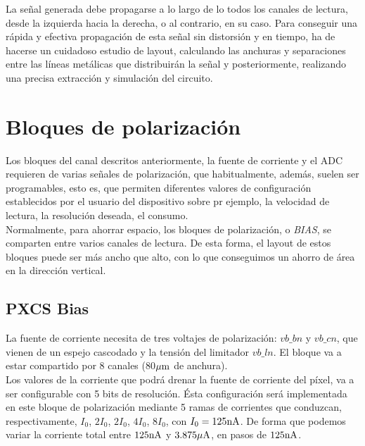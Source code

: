 La señal generada debe propagarse a lo largo de lo todos los canales de lectura,
desde la izquierda hacia la derecha, o al contrario, en su caso. Para conseguir
una rápida y efectiva propagación de esta señal sin distorsión y en tiempo, ha
de hacerse un cuidadoso estudio de layout, calculando las anchuras y separaciones
entre las líneas metálicas que distribuirán la señal y posteriormente, realizando
una precisa extracción y simulación del circuito.\\

\section{Bloques de polarización}\label{cap:ro_sch_bias}

Los bloques del canal descritos anteriormente, la fuente de corriente y el ADC
requieren de varias señales de polarización, que habitualmente, además, suelen
ser programables, esto es, que permiten diferentes valores de configuración
establecidos por el usuario del dispositivo sobre pr ejemplo, la velocidad de
lectura, la resolución deseada, el consumo.\\

Normalmente, para ahorrar espacio, los bloques de polarización, o \textit{BIAS},
se comparten entre varios canales de lectura. De esta forma, el layout de estos
bloques puede ser más ancho que alto, con lo que conseguimos un ahorro de área en
la dirección vertical.\\

\subsection{PXCS Bias}

La fuente de corriente necesita de tres voltajes de polarización: $vb\_bn$ y
$vb\_cn$, que vienen de un espejo cascodado y la tensión del limitador $vb\_ln$.
El bloque va a estar compartido por 8 canales (80$\mu\text{m}$ de anchura).\\

Los valores de la corriente que podrá drenar la fuente de corriente del píxel, va
a ser configurable con 5 bits de resolución. Ésta configuración será implementada
en este bloque de polarización mediante 5 ramas de corrientes que conduzcan,
respectivamente, $I_0$, $2I_0$, $2I_0$, $4I_0$, $8I_0$, con
$I_0=125\text{nA}$. De forma que podemos variar la corriente total entre $125\text{nA}$ y
$3.875\mu\text{A}$, en pasos de $125\text{nA}$.\\

